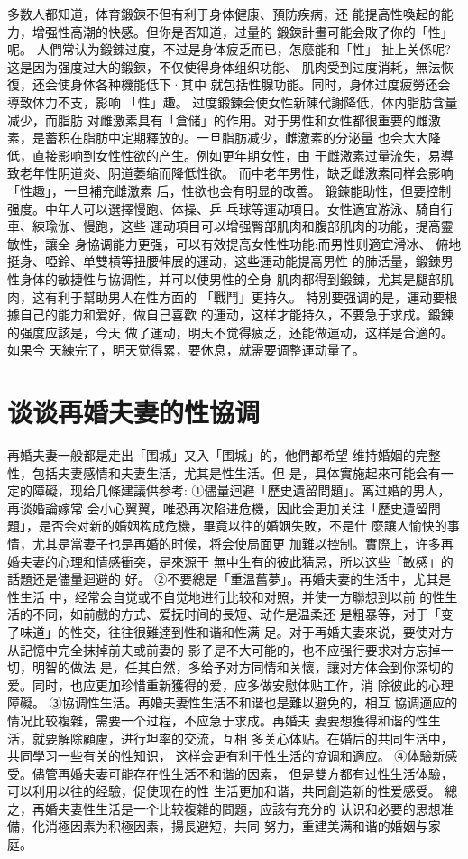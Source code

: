\documentclass[12pt,UTF8]{ctexbook}
\begin{document}
多数人都知道，体育鍛鍊不但有利于身体健康、預防疾病，还
能提高性喚起的能力，增强性高潮的快感。但你是否知道，过量的
鍛鍊計畫可能会敗了你的「性」呢。
人們常认为鍛鍊过度，不过是身体疲乏而已，怎麼能和「性」
扯上关係呢?这是因为强度过大的鍛鍊，不仅使得身体组织功能、
肌肉受到过度消耗，無法恢復，还会使身体各种機能低下·其中
就包括性腺功能。同时，身体过度疲勞还会導致体力不支，影响
「性」趣。
过度鍛鍊会使女性新陳代謝降低，体内脂肪含量减少，而脂肪
对雌激素具有「倉储」的作用。对于男性和女性都很重要的雌激
素，是蓄积在脂肪中定期釋放的。一旦脂肪减少，雌激素的分泌量
也会大大降低，直接影响到女性性欲的产生。例如更年期女性，由
于雌激素过量流失，易導致老年性阴道炎、阴道萎缩而降低性欲。
而中老年男性，缺乏雌激素同样会影响「性趣」，一旦補充雌激素
后，性欲也会有明显的改善。
鍛鍊能助性，但要控制强度。中年人可以選擇慢跑、体操、乒
乓球等運动項目。女性適宜游泳、騎自行車、練瑜伽、慢跑，这些
運动項目可以增强臀部肌肉和腹部肌肉的功能，提高靈敏性，讓全
身協调能力更强，可以有效提高女性性功能:而男性则適宜滑冰、
俯地挺身、啞鈴、单雙槓等扭腰伸展的運动，这些運动能提高男性
的肺活量，鍛鍊男性身体的敏捷性与協调性，并可以使男性的全身
肌肉都得到鍛鍊，尤其是腿部肌肉，这有利于幫助男人在性方面的
「戰鬥」更持久。
特別要强调的是，運动要根據自己的能力和爱好，做自己喜歡
的運动，这样才能持久，不要急于求成。鍛鍊的强度应該是，今天
做了運动，明天不觉得疲乏，还能做運动，这样是合適的。如果今
天練完了，明天觉得累，要休息，就需要调整運动量了。

\section{谈谈再婚夫妻的性協调}

再婚夫妻一般都是走出「围城」又入「围城」的，他們都希望
维持婚姻的完整性，包括夫妻感情和夫妻生活，尤其是性生活。但
是，具体實施起來可能会有一定的障礙，现给几條建議供参考:
①儘量迴避「歷史遺留問題」。离过婚的男人，再谈婚論嫁常
会小心翼翼，唯恐再次陷进危機，因此会更加关注「歷史遺留問
題」，是否会对新的婚姻构成危機，畢竟以往的婚姻失敗，不是什
麼讓人愉快的事情，尤其是當妻子也是再婚的时候，将会使局面更
加難以控制。實際上，许多再婚夫妻的心理和情感衝突，是來源于
無中生有的彼此猜忌，所以这些「敏感」的話題还是儘量迴避的
好。
②不要總是「重温舊夢」。再婚夫妻的生活中，尤其是性生活
中，经常会自觉或不自觉地进行比较和对照，并使一方聯想到以前
的性生活的不同，如前戲的方式、爱抚时间的長短、动作是温柔还
是粗暴等，对于「变了味道」的性交，往往很難達到性和谐和性满
足。对于再婚夫妻來说，要使对方从記憶中完全抹掉前夫或前妻的
影子是不大可能的，也不应强行要求对方忘掉一切，明智的做法
是，任其自然，多给予对方同情和关懷，讓对方体会到你深切的
爱。同时，也应更加珍惜重新獲得的爱，应多做安慰体贴工作，消
除彼此的心理障礙。
③協调性生活。再婚夫妻性生活不和谐也是難以避免的，相互
協调適应的情况比较複雜，需要一个过程，不应急于求成。再婚夫
妻要想獲得和谐的性生活，就要解除顧慮，进行坦率的交流，互相
多关心体贴。在婚后的共同生活中，共同學习一些有关的性知识，
这样会更有利于性生活的協调和適应。
④体驗新感受。儘管再婚夫妻可能存在性生活不和谐的因素，
但是雙方都有过性生活体驗，可以利用以往的经驗，促使现在的性
生活更加和谐，共同創造新的性爱感受。
總之，再婚夫妻性生活是一个比较複雜的問題，应該有充分的
认识和必要的思想准備，化消極因素为积極因素，揚長避短，共同
努力，重建美满和谐的婚姻与家庭。
\end{document}

